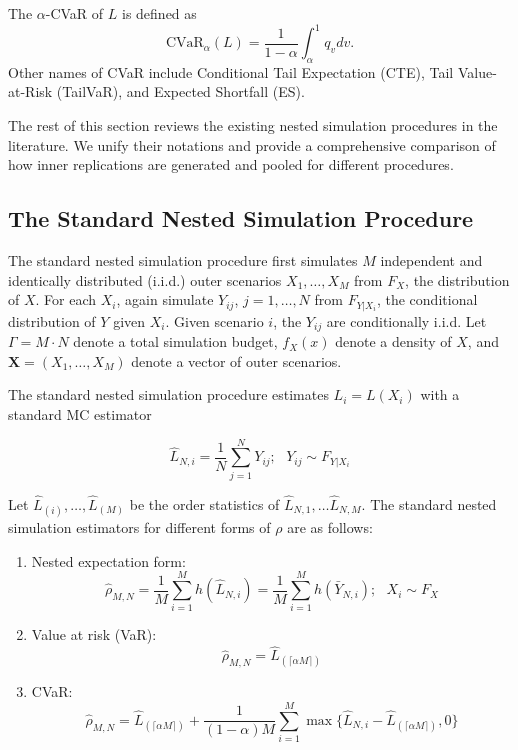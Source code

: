 The $\alpha$-CVaR of $L$ is defined as
\begin{equation} \label{eq1:cvar}
    \mbox{CVaR}_\alpha(L) =\frac{1}{1-\alpha} \int_{\alpha}^{1} q_v dv. 
\end{equation}
Other names of CVaR include Conditional Tail Expectation (CTE), Tail Value-at-Risk (TailVaR), and Expected Shortfall (ES).

The rest of this section reviews the existing nested simulation procedures in the literature.
We unify their notations and provide a comprehensive comparison of how inner replications are generated and pooled for different procedures.

\subsection{The Standard Nested Simulation Procedure}

The standard nested simulation procedure first simulates $M$ independent and identically distributed (i.i.d.) outer scenarios $X_1, \dots, X_M$ from $F_X$, the distribution of $X$.
For each $X_i$, again simulate $Y_{ij}$, $j = 1, \dots, N$ from $F_{Y|X_i}$, the conditional distribution of $Y$ given $X_i$. Given scenario $i$, the $Y_{ij}$ are conditionally i.i.d. Let $\Gamma = M \cdot N$ denote a total simulation budget, $f_X(x)$ denote a density of $X$, and $\mathbf{X} = (X_1, \dots, X_M)$ denote a vector of outer scenarios.

The standard nested simulation procedure estimates $L_i = L(X_i)$ with a standard MC estimator 

$$\hat{L}_{N, i} = \frac{1}{N} \sum_{j=1}^N Y_{ij}; ~~~ Y_{ij} \sim F_{Y|X_i} $$

Let $\hat{L}_{(i)}, \dots, \hat{L}_{(M)}$ be the order statistics of $\hat{L}_{N, 1}, \dots \hat{L}_{N, M}$. 
The standard nested simulation estimators for different forms of $\rho$ are as follows:

\begin{enumerate}
    \item   Nested expectation form:
            $$\hat{\rho}_{M, N} = \frac{1}{M} \sum_{i=1}^M h(\hat{L}_{N, i}) = \frac{1}{M} \sum_{i=1}^M h(\bar{Y}_{N, i}); ~~~ X_i \sim F_X$$
    \item   Value at risk (VaR):
            $$\hat{\rho}_{M, N} = \hat{L}_{(\lceil \alpha M \rceil)}$$
    \item   CVaR:
            \begin{equation} \label{eq1:cvar-hat}
                \hat{\rho}_{M, N} = \hat{L}_{(\lceil \alpha M \rceil)} + \frac{1}{(1-\alpha) M} \sum_{i=1}^M \max \{\hat{L}_{N, i} - \hat{L}_{(\lceil \alpha M \rceil)}, 0 \}
            \end{equation}
\end{enumerate}

